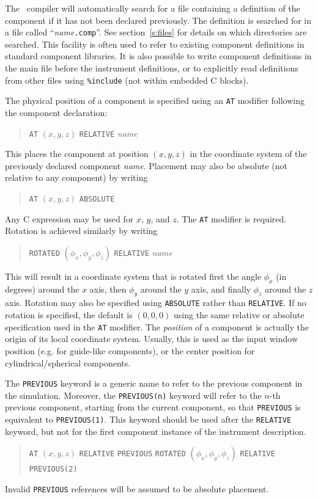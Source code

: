 The \MCS\ compiler will automatically search for a file containing a
definition of the component if it has not been declared previously. The
definition is searched for in a file called ``{\it name\/}{\tt .comp}''. See
section~\ref{s:files} for details on which directories are searched. This
facility is often used to refer to existing component definitions in
standard component libraries. It is also possible to write component
definitions in the main file before the instrument definitions, or to
explicitly read definitions from other files using \verb+%include+
(not within embedded C blocks).

The physical position of a component is specified using an \texttt{AT} modifier
following the component declaration:
  
\begin{quote}
  \texttt{AT} $(x,y,z)$ \texttt{RELATIVE} \textit{name}
\end{quote}
This places the component at position $(x,y,z)$ in the coordinate system
of the previously declared component \textit{name}. Placement may also
be absolute (not relative to any component) by writing
\begin{quote}
  \texttt{AT} $(x,y,z)$ \texttt{ABSOLUTE}
\end{quote}
Any C expression may be used for $x$, $y$, and $z$. The \texttt{AT}
modifier is required.
Rotation is achieved similarly by writing 
\begin{quote}
  \texttt{ROTATED} $(\phi_x,\phi_y,\phi_z)$ \texttt{RELATIVE} \textit{name}
\end{quote}
This will result in a coordinate system that is rotated first the angle
$\phi_x$ (in degrees) around the $x$ axis, then $\phi_y$ around the $y$ axis, and finally
$\phi_z$ around the $z$ axis. Rotation may also be specified using
\texttt{ABSOLUTE} rather than \texttt{RELATIVE}. If no rotation is
specified, the default is $(0,0,0)$ using the same relative or absolute
specification used in the \texttt{AT} modifier. The \emph{position} of
a component is actually the origin of its local coordinate
system. Usually, this is used as the input window position (e.g. for
guide-like components), or the center position for
cylindrical/spherical components.

The \texttt{PREVIOUS}  keyword is a generic name to refer to the previous component in the simulation. Moreover, the \texttt{PREVIOUS(n)} keyword will refer to the $n$-th previous component, starting from the current component, so that \texttt{PREVIOUS} is equivalent to \texttt{PREVIOUS(1)}. This keyword should be used after the \texttt{RELATIVE} keyword, but not for the first component instance of the instrument description.
\begin{quote}
  \texttt{AT} $(x,y,z)$ \texttt{RELATIVE} \texttt{PREVIOUS}
  \texttt{ROTATED} $(\phi_x,\phi_y,\phi_z)$ \texttt{RELATIVE} \texttt{PREVIOUS(2)}
\end{quote}
Invalid \texttt{PREVIOUS} references will be assumed to be absolute placement.

